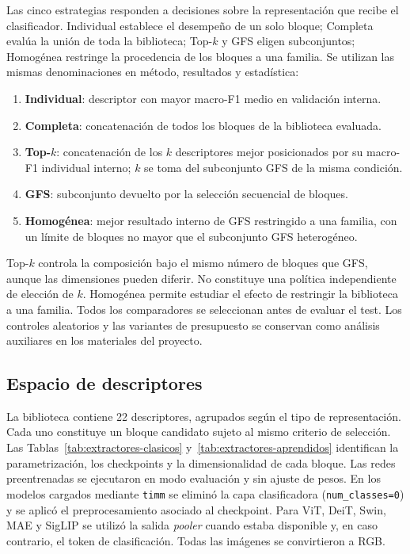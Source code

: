 \documentclass[a4paper,fleqn]{cas-sc}
\begin{document}
Las cinco estrategias responden a decisiones sobre la representación que recibe el clasificador. Individual establece el desempeño de un solo bloque; Completa evalúa la unión de toda la biblioteca; Top-$k$ y GFS eligen subconjuntos; Homogénea restringe la procedencia de los bloques a una familia. Se utilizan las mismas denominaciones en método, resultados y estadística:
\begin{enumerate}
\item \textbf{Individual}: descriptor con mayor macro-F1 medio en validación interna.
\item \textbf{Completa}: concatenación de todos los bloques de la biblioteca evaluada.
\item \textbf{Top-$k$}: concatenación de los $k$ descriptores mejor posicionados por su macro-F1 individual interno; $k$ se toma del subconjunto GFS de la misma condición.
\item \textbf{GFS}: subconjunto devuelto por la selección secuencial de bloques.
\item \textbf{Homogénea}: mejor resultado interno de GFS restringido a una familia, con un límite de bloques no mayor que el subconjunto GFS heterogéneo.
\end{enumerate}
Top-$k$ controla la composición bajo el mismo número de bloques que GFS, aunque las dimensiones pueden diferir. No constituye una política independiente de elección de $k$. Homogénea permite estudiar el efecto de restringir la biblioteca a una familia. Todos los comparadores se seleccionan antes de evaluar el test. Los controles aleatorios y las variantes de presupuesto se conservan como análisis auxiliares en los materiales del proyecto.

\subsection{Espacio de descriptores}

La biblioteca contiene 22 descriptores, agrupados según el tipo de representación. Cada uno constituye un bloque candidato sujeto al mismo criterio de selección. Las
Tablas~\ref{tab:extractores-clasicos} y~\ref{tab:extractores-aprendidos}
identifican la parametrización, los checkpoints y la dimensionalidad de cada
bloque. Las redes preentrenadas se ejecutaron en modo evaluación y sin
ajuste de pesos. En los modelos cargados mediante \texttt{timm} se eliminó la
capa clasificadora (\texttt{num\_classes=0}) y se aplicó el preprocesamiento
asociado al checkpoint. Para ViT, DeiT, Swin, MAE y SigLIP se utilizó la salida
\emph{pooler} cuando estaba disponible y, en caso contrario, el token de
clasificación. Todas las imágenes se convirtieron a RGB.
\end{document}
